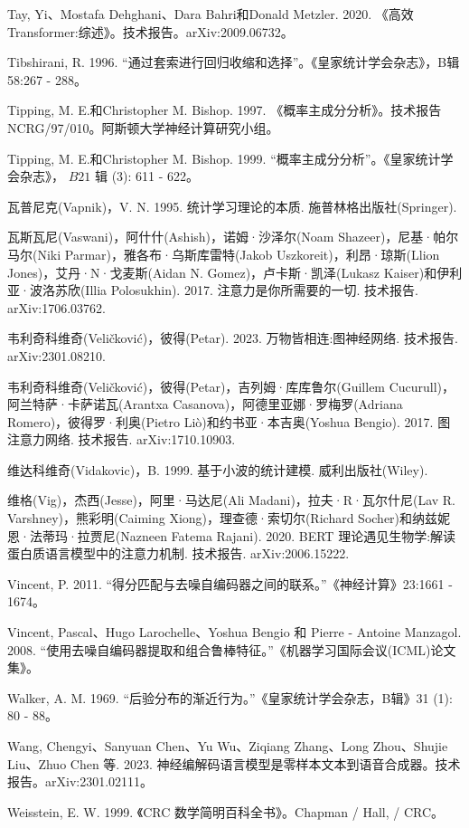 \documentclass[10pt]{article}
\begin{document}
Tay, Yi、Mostafa Dehghani、Dara Bahri和Donald Metzler. 2020. 《高效Transformer:综述》。技术报告。arXiv:2009.06732。

Tibshirani, R. 1996. “通过套索进行回归收缩和选择”。《皇家统计学会杂志》，B辑 58:267 - 288。

Tipping, M. E.和Christopher M. Bishop. 1997. 《概率主成分分析》。技术报告NCRG/97/010。阿斯顿大学神经计算研究小组。

Tipping, M. E.和Christopher M. Bishop. 1999. “概率主成分分析”。《皇家统计学会杂志》， \({B21}\) 辑 (3): 611 - 622。

瓦普尼克(Vapnik)，V. N. 1995. 统计学习理论的本质. 施普林格出版社(Springer).

瓦斯瓦尼(Vaswani)，阿什什(Ashish)，诺姆·沙泽尔(Noam Shazeer)，尼基·帕尔马尔(Niki Parmar)，雅各布·乌斯库雷特(Jakob Uszkoreit)，利昂·琼斯(Llion Jones)，艾丹·N·戈麦斯(Aidan N. Gomez)，卢卡斯·凯泽(Lukasz Kaiser)和伊利亚·波洛苏欣(Illia Polosukhin). 2017. 注意力是你所需要的一切. 技术报告. arXiv:1706.03762.

韦利奇科维奇(Veličković)，彼得(Petar). 2023. 万物皆相连:图神经网络. 技术报告. arXiv:2301.08210.

韦利奇科维奇(Veličković)，彼得(Petar)，吉列姆·库库鲁尔(Guillem Cucurull)，阿兰特萨·卡萨诺瓦(Arantxa Casanova)，阿德里亚娜·罗梅罗(Adriana Romero)，彼得罗·利奥(Pietro Liò)和约书亚·本吉奥(Yoshua Bengio). 2017. 图注意力网络. 技术报告. arXiv:1710.10903.

维达科维奇(Vidakovic)，B. 1999. 基于小波的统计建模. 威利出版社(Wiley).

维格(Vig)，杰西(Jesse)，阿里·马达尼(Ali Madani)，拉夫·R·瓦尔什尼(Lav R. Varshney)，熊彩明(Caiming Xiong)，理查德·索切尔(Richard Socher)和纳兹妮恩·法蒂玛·拉贾尼(Nazneen Fatema Rajani). 2020. BERT 理论遇见生物学:解读蛋白质语言模型中的注意力机制. 技术报告. arXiv:2006.15222.

Vincent, P. 2011. “得分匹配与去噪自编码器之间的联系。”《神经计算》23:1661 - 1674。

Vincent, Pascal、Hugo Larochelle、Yoshua Bengio 和 Pierre - Antoine Manzagol. 2008. “使用去噪自编码器提取和组合鲁棒特征。”《机器学习国际会议(ICML)论文集》。

Walker, A. M. 1969. “后验分布的渐近行为。”《皇家统计学会杂志，B辑》31 (1): 80 - 88。

Wang, Chengyi、Sanyuan Chen、Yu Wu、Ziqiang Zhang、Long Zhou、Shujie Liu、Zhuo Chen 等. 2023. 神经编解码语言模型是零样本文本到语音合成器。技术报告。arXiv:2301.02111。

Weisstein, E. W. 1999. 《CRC 数学简明百科全书》。Chapman / Hall, / CRC。
\end{document}
